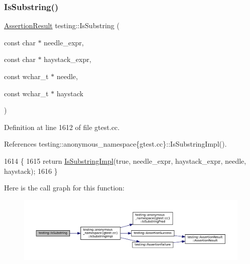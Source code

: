 \subsubsection{\texorpdfstring{Is\+Substring()}{IsSubstring()}\hspace{0.1cm}{\footnotesize\ttfamily [2/3]}}
{\footnotesize\ttfamily \hyperlink{classtesting_1_1AssertionResult}{Assertion\+Result} testing\+::\+Is\+Substring (\begin{DoxyParamCaption}\item[{const char $\ast$}]{needle\+\_\+expr,  }\item[{const char $\ast$}]{haystack\+\_\+expr,  }\item[{const wchar\+\_\+t $\ast$}]{needle,  }\item[{const wchar\+\_\+t $\ast$}]{haystack }\end{DoxyParamCaption})}



Definition at line 1612 of file gtest.\+cc.



References testing\+::anonymous\+\_\+namespace\{gtest.\+cc\}\+::\+Is\+Substring\+Impl().


\begin{DoxyCode}
1614                                                     \{
1615   \textcolor{keywordflow}{return} \hyperlink{namespacetesting_1_1anonymous__namespace_02gtest_8cc_03_a0e1cb1e2b03a87a9c893322e4caab670}{IsSubstringImpl}(\textcolor{keyword}{true}, needle\_expr, haystack\_expr, needle, haystack);
1616 \}
\end{DoxyCode}
Here is the call graph for this function\+:
\nopagebreak
\begin{figure}[H]
\begin{center}
\leavevmode
\includegraphics[width=350pt]{namespacetesting_aa1c82529c7591d2a9fd016de45dd9113_cgraph}
\end{center}
\end{figure}
\mbox{\label{namespacetesting_a571c7edcfc574269833ebe3e7d338ec5}} 
